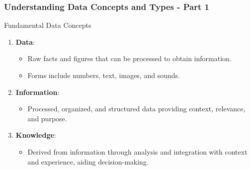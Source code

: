 \documentclass{beamer}
\begin{document}
\begin{frame}[fragile]
    \frametitle{Understanding Data Concepts and Types - Part 1}
    \begin{block}{Fundamental Data Concepts}
        \begin{enumerate}
            \item \textbf{Data}: 
            \begin{itemize}
                \item Raw facts and figures that can be processed to obtain information.
                \item Forms include numbers, text, images, and sounds.
            \end{itemize}
            
            \item \textbf{Information}:
            \begin{itemize}
                \item Processed, organized, and structured data providing context, relevance, and purpose.
            \end{itemize}
            
            \item \textbf{Knowledge}:
            \begin{itemize}
                \item Derived from information through analysis and integration with context and experience, aiding decision-making.
            \end{itemize}
        \end{enumerate}
    \end{block}
\end{frame}
\end{document}
